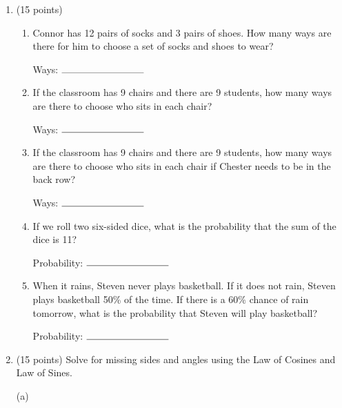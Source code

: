 \documentclass[11pt]{article}
\begin{document}
\begin{enumerate}
\item (15 points)
\begin{enumerate}[itemsep=60pt, label={\alph*)}]
\item Connor has 12 pairs of socks and 3 pairs of shoes. How many ways are there for him to choose a set of socks and shoes to wear?
\begin{flushright}
Ways: $\rule{3cm}{0.4pt}$
\end{flushright}
\item If the classroom has 9 chairs and there are 9 students, how many ways are there to choose who sits in each chair?
\begin{flushright}
Ways: $\rule{3cm}{0.4pt}$
\end{flushright}
\item If the classroom has 9 chairs and there are 9 students, how many ways are there to choose who sits in each chair if Chester needs to be in the back row?
\begin{flushright}
Ways: $\rule{3cm}{0.4pt}$
\end{flushright}
\item If we roll two six-sided dice, what is the probability that the sum of the dice is 11?
\begin{flushright}
Probability: $\rule{3cm}{0.4pt}$
\end{flushright}
\item When it rains, Steven never plays basketball. If it does not rain, Steven plays basketball 50\% of the time. If there is a 60\% chance of rain tomorrow, what is the probability that Steven will play basketball?
\begin{flushright}
Probability: $\rule{3cm}{0.4pt}$
\end{flushright}
\end{enumerate}

\newpage

\item (15 points) Solve for missing sides and angles using the Law of Cosines and Law of Sines.

(a) \\


\end{enumerate}
\end{document}
